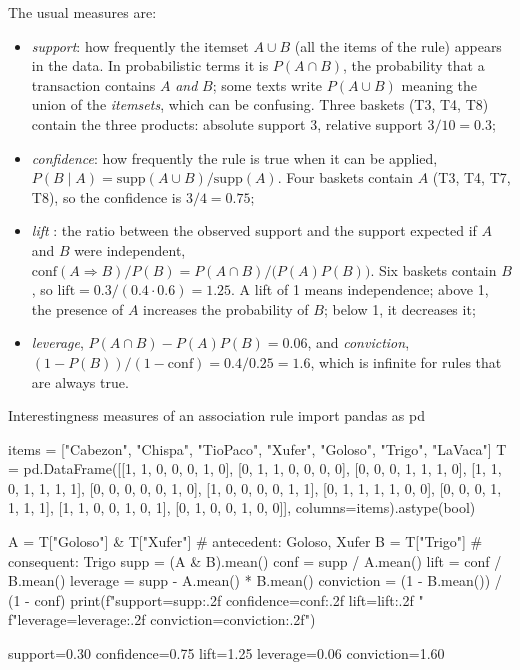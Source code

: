 The usual measures are:
\begin{itemize}
  \item \emph{support}: how frequently the itemset $A\cup B$ (all the items of the rule) appears
        in the data. In probabilistic terms it is $P(A\cap B)$, the probability that a
        transaction contains $A$ \emph{and} $B$; some texts write $P(A\cup B)$ meaning the
        union of the \emph{itemsets}, which can be confusing. Three baskets (T3, T4, T8) contain
        the three products: absolute support 3, relative support $3/10=0.3$;
  \item \emph{confidence}: how frequently the rule is true when it can be applied,
        $P(B\mid A)=\mathrm{supp}(A\cup B)/\mathrm{supp}(A)$. Four baskets contain $A$ (T3, T4,
        T7, T8), so the confidence is $3/4=0.75$;
  \item \emph{lift} \citep{brin1997dynamic}: the ratio between the observed support and the
        support expected if $A$ and $B$ were independent,
        $\mathrm{conf}(A\Rightarrow B)/P(B)=P(A\cap B)/\bigl(P(A)P(B)\bigr)$. Six baskets contain
        $B$, so $\mathrm{lift}=0.3/(0.4\cdot0.6)=1.25$. A lift of 1 means independence; above 1,
        the presence of $A$ increases the probability of $B$; below 1, it decreases it;
  \item \emph{leverage}, $P(A\cap B)-P(A)P(B)=0.06$, and \emph{conviction},
        $(1-P(B))/(1-\mathrm{conf})=0.4/0.25=1.6$, which is infinite for rules that are always
        true.
\end{itemize}

\begin{pylisting}[label={lst:assoc}]{Interestingness measures of an association rule}
import pandas as pd

items = ["Cabezon", "Chispa", "TioPaco", "Xufer", "Goloso", "Trigo", "LaVaca"]
T = pd.DataFrame([[1, 1, 0, 0, 0, 1, 0], [0, 1, 1, 0, 0, 0, 0], [0, 0, 0, 1, 1, 1, 0],
                  [1, 1, 0, 1, 1, 1, 1], [0, 0, 0, 0, 0, 1, 0], [1, 0, 0, 0, 0, 1, 1],
                  [0, 1, 1, 1, 1, 0, 0], [0, 0, 0, 1, 1, 1, 1], [1, 1, 0, 0, 1, 0, 1],
                  [0, 1, 0, 0, 1, 0, 0]], columns=items).astype(bool)

A = T["Goloso"] & T["Xufer"]          # antecedent: {Goloso, Xufer}
B = T["Trigo"]                        # consequent: {Trigo}
supp = (A & B).mean()
conf = supp / A.mean()
lift = conf / B.mean()
leverage = supp - A.mean() * B.mean()
conviction = (1 - B.mean()) / (1 - conf)
print(f"support={supp:.2f} confidence={conf:.2f} lift={lift:.2f} "
      f"leverage={leverage:.2f} conviction={conviction:.2f}")
\end{pylisting}
\begin{pyoutput}
support=0.30 confidence=0.75 lift=1.25 leverage=0.06 conviction=1.60
\end{pyoutput}

